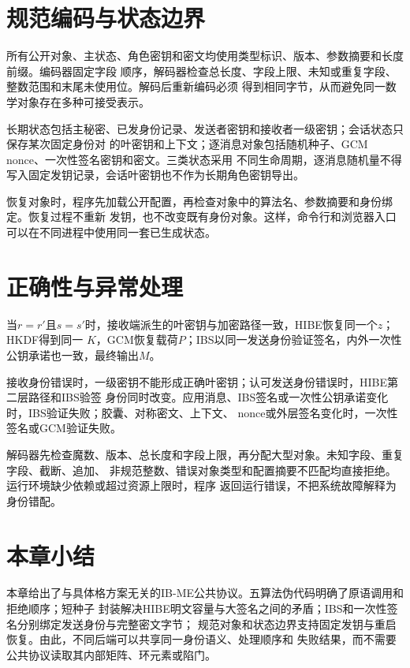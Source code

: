 \section{规范编码与状态边界}

所有公开对象、主状态、角色密钥和密文均使用类型标识、版本、参数摘要和长度前缀。编码器固定字段
顺序，解码器检查总长度、字段上限、未知或重复字段、整数范围和末尾未使用位。解码后重新编码必须
得到相同字节，从而避免同一数学对象存在多种可接受表示。

长期状态包括主秘密、已发身份记录、发送者密钥和接收者一级密钥；会话状态只保存某次固定身份对
的叶密钥和上下文；逐消息对象包括随机种子、GCM nonce、一次性签名密钥和密文。三类状态采用
不同生命周期，逐消息随机量不得写入固定发钥记录，会话叶密钥也不作为长期角色密钥导出。

恢复对象时，程序先加载公开配置，再检查对象中的算法名、参数摘要和身份绑定。恢复过程不重新
发钥，也不改变既有身份对象。这样，命令行和浏览器入口可以在不同进程中使用同一套已生成状态。

\section{正确性与异常处理}

当$r=r'$且$s=s'$时，接收端派生的叶密钥与加密路径一致，HIBE恢复同一个$z$；HKDF得到同一
$K$，GCM恢复载荷$P$；IBS以同一发送身份验证签名，内外一次性公钥承诺也一致，最终输出$M$。

接收身份错误时，一级密钥不能形成正确叶密钥；认可发送身份错误时，HIBE第二层路径和IBS验签
身份同时改变。应用消息、IBS签名或一次性公钥承诺变化时，IBS验证失败；胶囊、对称密文、上下文、
nonce或外层签名变化时，一次性签名或GCM验证失败。

解码器先检查魔数、版本、总长度和字段上限，再分配大型对象。未知字段、重复字段、截断、追加、
非规范整数、错误对象类型和配置摘要不匹配均直接拒绝。运行环境缺少依赖或超过资源上限时，程序
返回运行错误，不把系统故障解释为身份错配。

\section{本章小结}

本章给出了与具体格方案无关的IB-ME公共协议。五算法伪代码明确了原语调用和拒绝顺序；短种子
封装解决HIBE明文容量与大签名之间的矛盾；IBS和一次性签名分别绑定发送身份与完整密文字节；
规范对象和状态边界支持固定发钥与重启恢复。由此，不同后端可以共享同一身份语义、处理顺序和
失败结果，而不需要公共协议读取其内部矩阵、环元素或陷门。
